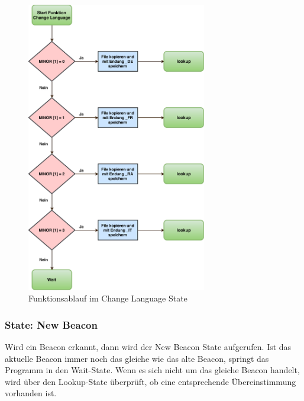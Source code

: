 \begin{figure}[htbp!!!!]
	\centering
	\includegraphics[width=0.7\textwidth]{Data/ChangeLanguage_picture.pdf}
	\caption[Statemachine: Change Language]{Funktionsablauf im Change Language State}
	\label{fig:changeLanguageState}
\end{figure} 

\subsubsection*{State: New Beacon}

Wird ein Beacon erkannt, dann wird der New Beacon State aufgerufen. Ist das aktuelle Beacon immer noch das gleiche wie das alte Beacon, springt das Programm in den Wait-State. Wenn es sich nicht um das gleiche Beacon handelt, wird über den Lookup-State überprüft, ob eine entsprechende Übereinstimmung vorhanden ist.

